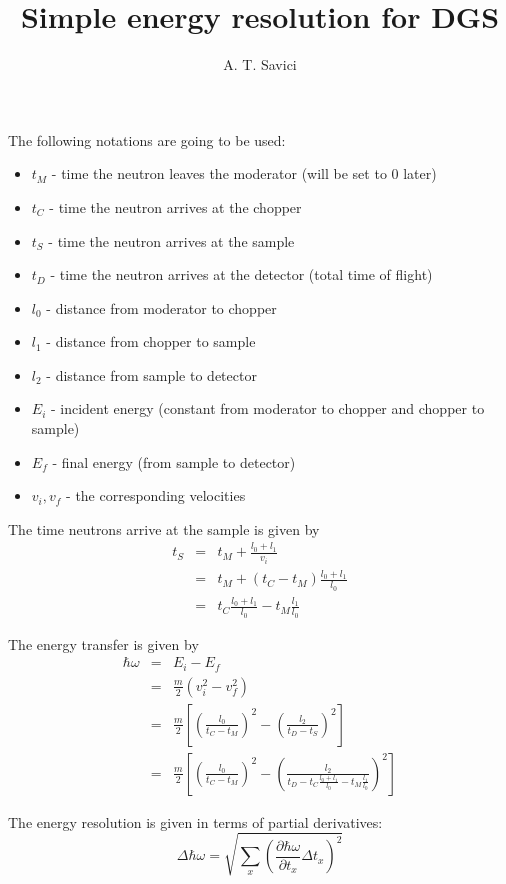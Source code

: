 \documentclass[11pt,oneside,reqno]{amsart}
\title{Simple energy resolution for DGS}
\author{A. T. Savici}
\begin{document}
\maketitle

The following notations are going to be used:
\begin{itemize}
\item $t_M$ - time the neutron leaves the moderator (will be set to 0 later)
\item $t_C$ - time the neutron arrives at the chopper
\item $t_S$ - time the neutron arrives at the sample
\item $t_D$ - time the neutron arrives at the detector (total time of flight)
\item $l_0$ - distance from moderator to chopper
\item $l_1$ - distance from chopper to sample
\item $l_2$ - distance from sample to detector
\item $E_i$ - incident energy (constant from moderator to chopper and chopper to sample)
\item $E_f$ - final energy (from sample to detector)
\item $v_i, v_f$ - the corresponding velocities
\end{itemize}

The time neutrons arrive at the sample is given by
\begin{eqnarray}
t_S &=& t_M + \frac{l_0+l_1}{v_i}\\
&=&t_M + (t_C - t_M)\frac{l_0+l_1}{l_0}\\
&=&t_C\frac{l_0+l_1}{l_0}-t_M\frac{l_1}{l_0}
\end{eqnarray}

The energy transfer is given by
\begin{eqnarray}
\hbar \omega &=& E_i-E_f\\
&=& \frac{m}{2}\left(v_i^2-v_f^2\right)\\
&=&\frac{m}{2}\left[\left(\frac{l_0}{t_C-t_M}\right)^2-\left(\frac{l_2}{t_D-t_S}\right)^2\right]\\
&=&\frac{m}{2}\left[\left(\frac{l_0}{t_C-t_M}\right)^2-\left(\frac{l_2}{t_D-t_C\frac{l_0+l_1}{l_0}-t_M\frac{l_1}{l_0}}\right)^2\right]
\end{eqnarray}

The energy resolution is given in terms of partial derivatives:
\begin{equation}
\Delta \hbar \omega = \sqrt{\sum_x \left(\frac{\partial \hbar \omega}{\partial t_x}\Delta t_x \right)^2}
\end{equation}
\end{document}
